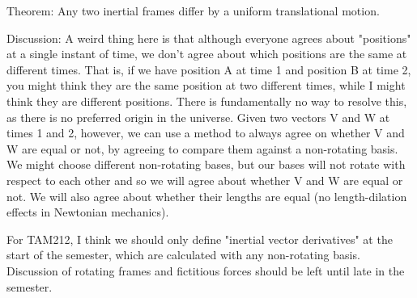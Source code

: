 \documentclass{article}
\begin{document}
Theorem: Any two inertial frames differ by a uniform translational
motion.

Discussion: A weird thing here is that although everyone agrees about
"positions" at a single instant of time, we don't agree about which
positions are the same at different times. That is, if we have
position A at time 1 and position B at time 2, you might think they
are the same position at two different times, while I might think they
are different positions. There is fundamentally no way to resolve
this, as there is no preferred origin in the universe. Given two
vectors V and W at times 1 and 2, however, we can use a method to
always agree on whether V and W are equal or not, by agreeing to
compare them against a non-rotating basis. We might choose different
non-rotating bases, but our bases will not rotate with respect to each
other and so we will agree about whether V and W are equal or not. We
will also agree about whether their lengths are equal (no
length-dilation effects in Newtonian mechanics).

For TAM212, I think we should only define "inertial vector
derivatives" at the start of the semester, which are calculated with
any non-rotating basis. Discussion of rotating frames and fictitious
forces should be left until late in the semester.
\end{document}
